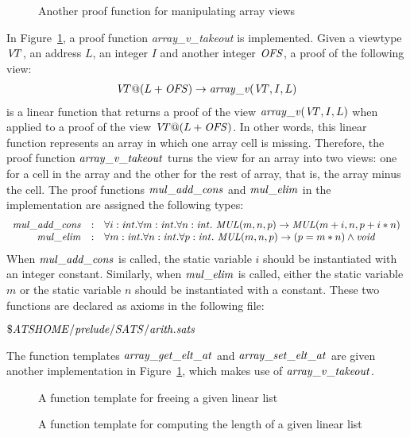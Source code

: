 \begin{figure}

\caption{Another proof function for manipulating array views}
\label{figure:array_v_takeout.dats}
\end{figure}
In Figure~\ref{figure:array_v_takeout.dats}, a proof function {\it
array\_v\_takeout} is implemented.
Given a viewtype ${\it V\!\!T}$, an address $L$, an integer $I$ and another integer
${\it OFS}$, a proof of the following view:
\[\begin{array}{c}
{\it V\!\!T} @ (L+{\it OFS}) \rightarrow {\it array\_v} ({\it V\!\!T}, I, L)
\end{array}\]
is a linear function that returns a proof of the view ${\it array\_v} ({\it V\!\!T},
I, L)$ when applied to a proof of the view $\VT@(L+{\it OFS})$. In other
words, this linear function represents an array in which one array cell is
missing.  Therefore, the proof function ${\it array\_v\_takeout}$ turns the
view for an array into two views: one for a cell in the array and the other
for the rest of array, that is, the array minus the cell.
The proof functions ${\it
mul\_add\_cons}$ and ${\it mul\_elim}$ in the implementation are assigned
the following types:
\[\begin{array}{rcl}
{\it mul\_add\_cons} & : &
\forall i:{\it int}.\forall m:{\it int}.\forall n:{\it int}.~{\it MUL}(m,n,p)\rightarrow {\it MUL}(m+i,n,p+i*n) \\
{\it mul\_elim} & : &
\forall m:{\it int}.\forall n:{\it int}.\forall p:{\it int}.~{\it MUL} (m, n, p)\rightarrow (p = m*n)\land{\it void} \\
\end{array}\]
When ${\it mul\_add\_cons}$ is called, the static variable $i$ should be
instantiated with an integer constant. Similarly, when ${\it mul\_elim}$ is
called, either the static variable $m$ or the static variable $n$ should be
instantiated with a constant. These two functions are declared as axioms in
the following file:
\begin{center}
${\it \$ATSHOME/prelude/SATS/arith.sats}$
\end{center}
The function templates ${\it array\_get\_elt\_at}$ and ${\it
array\_set\_elt\_at}$ are given another implementation in
Figure~\ref{figure:array_v_takeout.dats}, which makes use of ${\it
array\_v\_takeout}$.

\begin{figure}

\caption{A function template for freeing a given linear list}
\label{figure:list_vt_free.dats}
\end{figure}
\begin{figure}

\caption{A function template for computing the length of a given linear list}
\label{figure:list_vt_length.dats}
\end{figure}
